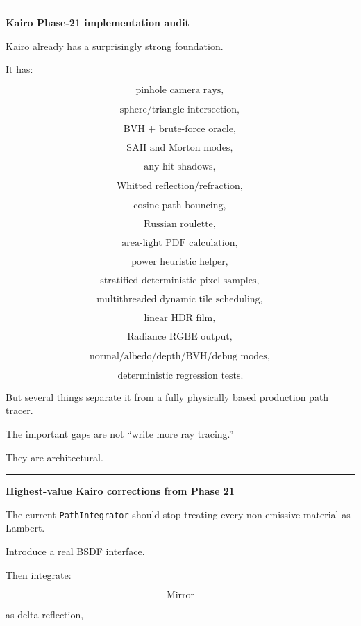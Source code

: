 \begin{center}\rule{0.5\linewidth}{0.5pt}\end{center}

\textbf{Kairo Phase-21 implementation audit}

Kairo already has a surprisingly strong foundation.

It has:

\[
\text{pinhole camera rays},
\]

\[
\text{sphere/triangle intersection},
\]

\[
\text{BVH + brute-force oracle},
\]

\[
\text{SAH and Morton modes},
\]

\[
\text{any-hit shadows},
\]

\[
\text{Whitted reflection/refraction},
\]

\[
\text{cosine path bouncing},
\]

\[
\text{Russian roulette},
\]

\[
\text{area-light PDF calculation},
\]

\[
\text{power heuristic helper},
\]

\[
\text{stratified deterministic pixel samples},
\]

\[
\text{multithreaded dynamic tile scheduling},
\]

\[
\text{linear HDR film},
\]

\[
\text{Radiance RGBE output},
\]

\[
\text{normal/albedo/depth/BVH/debug modes},
\]

\[
\text{deterministic regression tests}.
\]

But several things separate it from a fully physically based production path tracer.

The important gaps are not ``write more ray tracing.''

They are architectural.

\begin{center}\rule{0.5\linewidth}{0.5pt}\end{center}

\textbf{Highest-value Kairo corrections from Phase 21}

The current \texttt{PathIntegrator} should stop treating every non-emissive material as Lambert.

Introduce a real BSDF interface.

Then integrate:

\[
\text{Mirror}
\]

as delta reflection,

